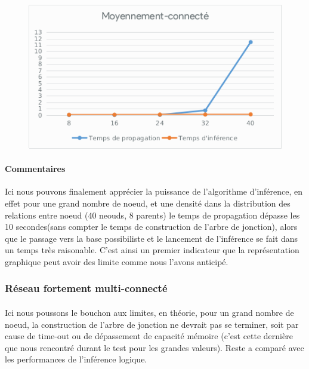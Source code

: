 \documentclass[]{report}
\begin{document}
	\begin{figure}[H]
		\centering
		\includegraphics[width=0.75\linewidth]{sheets/medium.png}
	\end{figure}

	\paragraph{Commentaires}
	Ici nous pouvons finalement apprécier la puissance de l'algorithme d'inférence, en effet pour une grand nombre de noeud,
	et une densité dans la distribution des relations entre noeud (40 neouds, 8 parents) le temps de propagation dépasse les 
	10 secondes(sans compter le temps de construction de l'arbre de jonction), alors que le passage vers la base possibiliste
	et le lancement de l'inférence se fait dans un temps très raisonable. C'est ainsi un premier indicateur que la représentation
	graphique peut avoir des limite comme nous l'avons anticipé.

	\subsubsection{Réseau fortement multi-connecté}
	\paragraph{}
	Ici nous poussons le bouchon aux limites, en théorie, pour un grand nombre de noeud, la construction de l'arbre de jonction
	ne devrait pas se terminer, soit par cause de time-out ou de dépassement de capacité mémoire (c'est cette dernière que nous
	rencontré durant le test pour les grandes valeurs). Reste a comparé avec les performances de l'inférence logique.
\end{document}
